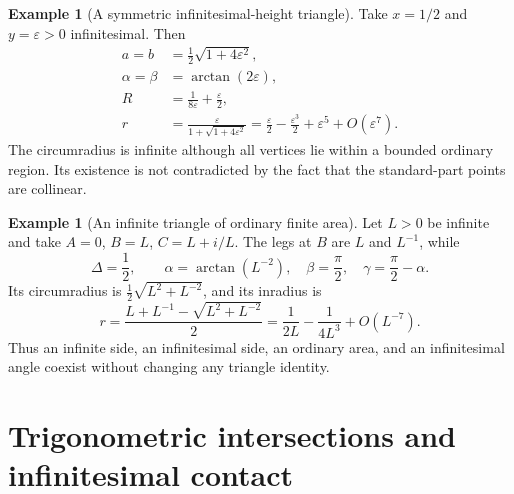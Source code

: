 \documentclass[11pt]{article}
\numberwithin{equation}{section}
\theoremstyle{definition}
\newtheorem{example}[theorem]{Example}
\newcommand{\eps}{\varepsilon}
\begin{document}
\begin{example}[A symmetric infinitesimal-height triangle]\label{ex:flat}
Take $x=1/2$ and $y=\eps>0$ infinitesimal. Then
\begin{align*}
 a=b&=\tfrac12\sqrt{1+4\eps^2},\\
 \alpha=\beta&=\arctan(2\eps),\\
 R&=\frac1{8\eps}+\frac\eps2,\\
 r&=\frac{\eps}{1+\sqrt{1+4\eps^2}}
   =\frac\eps2-\frac{\eps^3}{2}+\eps^5+O(\eps^7).
\end{align*}
The circumradius is infinite although all vertices lie within a bounded ordinary region. Its existence is not contradicted by the fact that the standard-part points are collinear.
\end{example}

\begin{example}[An infinite triangle of ordinary finite area]\label{ex:infinite}
Let $L>0$ be infinite and take $A=0$, $B=L$, $C=L+i/L$. The legs at $B$ are $L$ and $L^{-1}$, while
\[
 \Delta=\frac12,\qquad
 \alpha=\arctan(L^{-2}),\quad\beta=\frac\pi2,\quad
 \gamma=\frac\pi2-\alpha.
\]
Its circumradius is $\tfrac12\sqrt{L^2+L^{-2}}$, and its inradius is
\[
 r=\frac{L+L^{-1}-\sqrt{L^2+L^{-2}}}{2}
  =\frac1{2L}-\frac1{4L^3}+O(L^{-7}).
\]
Thus an infinite side, an infinitesimal side, an ordinary area, and an infinitesimal angle coexist without changing any triangle identity.
\end{example}

\section{Trigonometric intersections and infinitesimal contact}\label{sec:contact}
\end{document}
